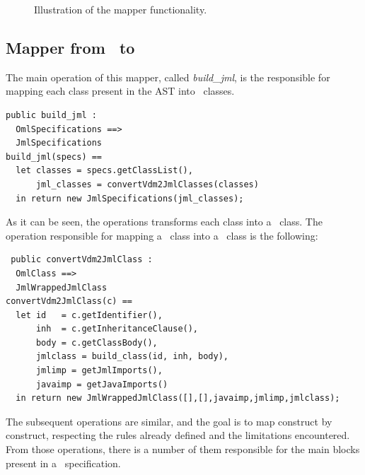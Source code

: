 \begin{figure}[!htb]
\begin{center}
\end{center}
\caption{Illustration of the mapper functionality.}
\label{chap5:figure:map}
\end{figure}

\subsection{Mapper from \vpp\ to \jml}
\label{chap5:secmap:subvppjml}

The main operation of this mapper, called \textit{build\_jml}, is the responsible for mapping each class present in the AST into \jml\ classes.

\bigskip
\begin{lstlisting}
public build_jml : 
  OmlSpecifications ==> 
  JmlSpecifications
build_jml(specs) == 
  let classes = specs.getClassList(),
      jml_classes = convertVdm2JmlClasses(classes)
  in return new JmlSpecifications(jml_classes);
\end{lstlisting}
\bigskip
As it can be seen, the operations transforms each class into a \jml\ class. The operation responsible for mapping a \vpp\ class into a \jml\ class is the following:
\bigskip
\begin{lstlisting}
 public convertVdm2JmlClass : 
  OmlClass ==> 
  JmlWrappedJmlClass
convertVdm2JmlClass(c) == 
  let id   = c.getIdentifier(),
	  inh  = c.getInheritanceClause(),
      body = c.getClassBody(),
      jmlclass = build_class(id, inh, body),
      jmlimp = getJmlImports(),
      javaimp = getJavaImports()
  in return new JmlWrappedJmlClass([],[],javaimp,jmlimp,jmlclass);
\end{lstlisting}
\bigskip
The subsequent operations are similar, and the goal is to map construct by construct, respecting the rules already defined and the limitations encountered. From those operations, there is a number of them responsible for the main blocks present in a \vpp\ specification.

